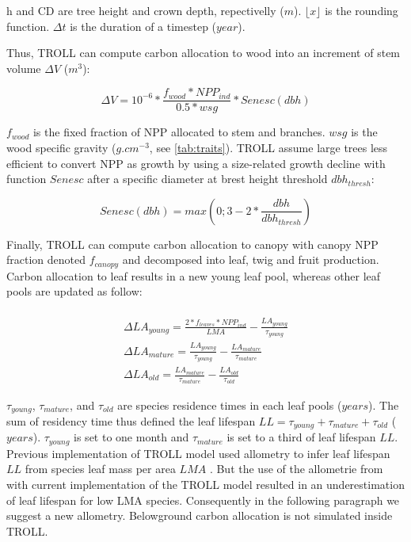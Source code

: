 \documentclass[]{article}
\theoremstyle{definition}
\theoremstyle{definition}
\theoremstyle{remark}
\begin{document}
h and CD are tree height and crown depth, repectivelly (\(m\)).
\(\lfloor x \rfloor\) is the rounding function. \(\Delta t\) is the
duration of a timestep (\(year\)).

Thus, TROLL can compute carbon allocation to wood into an increment of
stem volume \(\Delta V\) (\(m^3\)):

\begin{equation}
  \Delta V = 10^{-6} * \frac{f_{wood}*NPP_{ind}}{0.5*wsg}*Senesc(dbh)
  \label{eq:DeltaV}
\end{equation}

\(f_{wood}\) is the fixed fraction of NPP allocated to stem and
branches. \(wsg\) is the wood specific gravity (\(g.cm^{-3}\), see
\ref{tab:traits}). TROLL assume large trees less efficient to convert
NPP as growth by using a size-related growth decline with function
\(Senesc\) after a specific diameter at brest height threshold
\(dbh_{thresh}\):

\begin{equation}
  Senesc(dbh) = max(0;3-2*\frac{dbh}{dbh_{thresh}})
  \label{eq:Senesc}
\end{equation}

Finally, TROLL can compute carbon allocation to canopy with canopy NPP
fraction denoted \(f_{canopy}\) and decomposed into leaf, twig and fruit
production. Carbon allocation to leaf results in a new young leaf pool,
whereas other leaf pools are updated as follow:

\begin{equation}
  \begin{array}{c} \\
   \Delta LA_{young} = \frac{2*f_{leaves}*NPP_{ind}}{LMA}-\frac{LA_{young}}{\tau_{young}} \\
  \Delta LA_{mature} = \frac{LA_{young}}{\tau_{young}} - \frac{LA_{mature}}{\tau_{mature}}\\
  \Delta LA_{old} = \frac{LA_{mature}}{\tau_{mature}} - \frac{LA_{old}}{\tau_{old}}
  \end{array}
  \label{eq:DeltaLA}
\end{equation}

\(\tau_{young}\), \(\tau_{mature}\), and \(\tau_{old}\) are species
residence times in each leaf pools (\(years\)). The sum of residency
time thus defined the leaf lifespan
\(LL = \tau_{young} + \tau_{mature} + \tau_{old}\) (\(years\)).
\(\tau_{young}\) is set to one month and \(\tau_{mature}\) is set to a
third of leaf lifespan \(LL\). Previous implementation of TROLL model
used \citet{Reich1991a} allometry to infer leaf lifespan \(LL\) from
species leaf mass per area \(LMA\) \citep{Li}. But the use of the
allometrie from \citet{Reich1991a} with current implementation of the
TROLL model resulted in an underestimation of leaf lifespan for low LMA
species. Consequently in the following paragraph we suggest a new
allometry. Belowground carbon allocation is not simulated inside TROLL.
\end{document}
